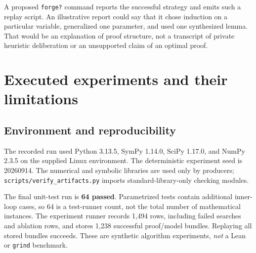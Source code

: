 \documentclass[11pt,letterpaper]{article}
\newcommand{\code}[1]{\texttt{#1}}
\theoremstyle{definition}\newtheorem{definition}[theorem]{Definition}
\theoremstyle{remark}\newtheorem{remark}[theorem]{Remark}
\begin{document}
A proposed \code{forge?} command reports the successful strategy and emits such a replay script. An illustrative report could say that it chose induction on a particular variable, generalized one parameter, and used one synthesized lemma. That would be an explanation of proof structure, not a transcript of private heuristic deliberation or an unsupported claim of an optimal proof.

\section{Executed experiments and their limitations}
\subsection{Environment and reproducibility}
The recorded run used Python 3.13.5, SymPy 1.14.0, SciPy 1.17.0, and NumPy 2.3.5 on the supplied Linux environment. The deterministic experiment seed is 20260914. The numerical and symbolic libraries are used only by producers; \code{scripts/verify\_artifacts.py} imports standard-library-only checking modules.

The final unit-test run is \textbf{64 passed}. Parametrized tests contain additional inner-loop cases, so 64 is a test-runner count, not the total number of mathematical instances. The experiment runner records 1,494 rows, including failed searches and ablation rows, and stores 1,238 successful proof/model bundles. Replaying all stored bundles succeeds. These are synthetic algorithm experiments, \emph{not} a Lean or \code{grind} benchmark.
\end{document}
